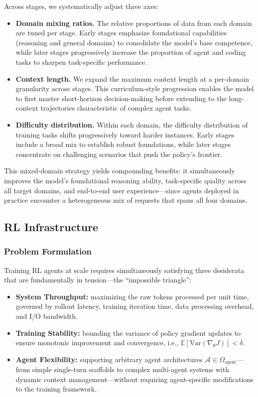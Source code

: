 Across stages, we systematically adjust three axes:
\begin{itemize}
    \item \textbf{Domain mixing ratios.} The relative proportions of data from each domain are tuned per stage. Early stages emphasize foundational capabilities (reasoning and general domains) to consolidate the model's base competence, while later stages progressively increase the proportion of agent and coding tasks to sharpen task-specific performance.
    \item \textbf{Context length.} We expand the maximum context length at a per-domain granularity across stages. This curriculum-style progression enables the model to first master short-horizon decision-making before extending to the long-context trajectories characteristic of complex agent tasks.
    \item \textbf{Difficulty distribution.} Within each domain, the difficulty distribution of training tasks shifts progressively toward harder instances. Early stages include a broad mix to establish robust foundations, while later stages concentrate on challenging scenarios that push the policy's frontier.
\end{itemize}

This mixed-domain strategy yields compounding benefits: it simultaneously improves the model's foundational reasoning ability, task-specific quality across all target domains, and end-to-end user experience---since agents deployed in practice encounter a heterogeneous mix of requests that spans all four domains.

\subsection{RL Infrastructure}

\subsubsection{Problem Formulation}

Training RL agents at scale requires simultaneously satisfying three desiderata that are fundamentally in tension---the ``impossible triangle'':
\begin{itemize}
    \item \textbf{System Throughput:} maximizing the raw tokens processed per unit time, governed by rollout latency, training iteration time, data processing overhead, and I/O bandwidth.
    \item \textbf{Training Stability:} bounding the variance of policy gradient updates to ensure monotonic improvement and convergence, i.e., $\mathbb{E}[\mathrm{Var}(\nabla_\theta J)] < \delta$.
    \item \textbf{Agent Flexibility:} supporting arbitrary agent architectures $\mathcal{A} \in \Omega_{\text{agent}}$---from simple single-turn scaffolds to complex multi-agent systems with dynamic context management---without requiring agent-specific modifications to the training framework.
\end{itemize}

